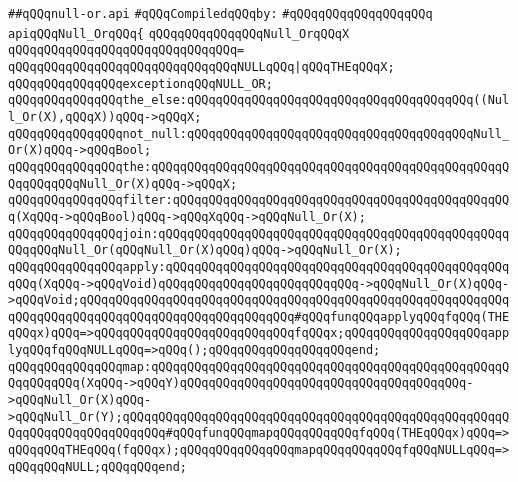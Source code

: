 \label{src/lib/std/src/null-or.api}
\verb|##qQQqnull-or.api|\newline
\newline
\verb|#qQQqCompiledqQQqby:|\newline
\verb|#qQQqqQQqqQQqqQQqqQQq|\newline
\newline
\newline
\newline
\verb|apiqQQqNull_OrqQQq{|\newline
\newline
\verb|qQQqqQQqqQQqqQQqNull_OrqQQqX|\newline
\verb|qQQqqQQqqQQqqQQqqQQqqQQqqQQqqQQq=|\newline
\verb|qQQqqQQqqQQqqQQqqQQqqQQqqQQqqQQqNULLqQQq|\verb#|qQQqTHEqQQqX;#\newline
\newline
\verb|qQQqqQQqqQQqqQQqexceptionqQQqNULL_OR;|\newline
\newline
\verb|qQQqqQQqqQQqqQQqthe_else:qQQqqQQqqQQqqQQqqQQqqQQqqQQqqQQqqQQqqQQq((Null_Or(X),qQQqX))qQQq->qQQqX;|\newline
\newline
\verb|qQQqqQQqqQQqqQQqnot_null:qQQqqQQqqQQqqQQqqQQqqQQqqQQqqQQqqQQqqQQqNull_Or(X)qQQq->qQQqBool;|\newline
\verb|qQQqqQQqqQQqqQQqthe:qQQqqQQqqQQqqQQqqQQqqQQqqQQqqQQqqQQqqQQqqQQqqQQqqQQqqQQqqQQqNull_Or(X)qQQq->qQQqX;|\newline
\newline
\verb|qQQqqQQqqQQqqQQqfilter:qQQqqQQqqQQqqQQqqQQqqQQqqQQqqQQqqQQqqQQqqQQqqQQq(XqQQq->qQQqBool)qQQq->qQQqXqQQq->qQQqNull_Or(X);|\newline
\verb|qQQqqQQqqQQqqQQqjoin:qQQqqQQqqQQqqQQqqQQqqQQqqQQqqQQqqQQqqQQqqQQqqQQqqQQqqQQqNull_Or(qQQqNull_Or(X)qQQq)qQQq->qQQqNull_Or(X);|\newline
\newline
\verb|qQQqqQQqqQQqqQQqapply:qQQqqQQqqQQqqQQqqQQqqQQqqQQqqQQqqQQqqQQqqQQqqQQqqQQq(XqQQq->qQQqVoid)qQQqqQQqqQQqqQQqqQQqqQQqqQQq->qQQqNull_Or(X)qQQq->qQQqVoid;qQQqqQQqqQQqqQQqqQQqqQQqqQQqqQQqqQQqqQQqqQQqqQQqqQQqqQQqqQQqqQQqqQQqqQQqqQQqqQQqqQQqqQQqqQQqqQQqqQQq#qQQqfunqQQqapplyqQQqfqQQq(THEqQQqx)qQQq=>qQQqqQQqqQQqqQQqqQQqqQQqqQQqfqQQqx;qQQqqQQqqQQqqQQqqQQqapplyqQQqfqQQqNULLqQQq=>qQQq();qQQqqQQqqQQqqQQqqQQqend;|\newline
\verb|qQQqqQQqqQQqqQQqmap:qQQqqQQqqQQqqQQqqQQqqQQqqQQqqQQqqQQqqQQqqQQqqQQqqQQqqQQqqQQq(XqQQq->qQQqY)qQQqqQQqqQQqqQQqqQQqqQQqqQQqqQQqqQQqqQQq->qQQqNull_Or(X)qQQq->qQQqNull_Or(Y);qQQqqQQqqQQqqQQqqQQqqQQqqQQqqQQqqQQqqQQqqQQqqQQqqQQqqQQqqQQqqQQqqQQqqQQqqQQq#qQQqfunqQQqmapqQQqqQQqqQQqfqQQq(THEqQQqx)qQQq=>qQQqqQQqTHEqQQq(fqQQqx);qQQqqQQqqQQqqQQqmapqQQqqQQqqQQqfqQQqNULLqQQq=>qQQqqQQqNULL;qQQqqQQqend;|\newline
